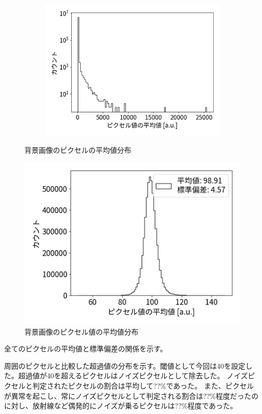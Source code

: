 \documentclass[a4paper,11pt,uplatex]{jsbook}
\begin{document}
\begin{figure}[b]
\begin{subfigure}[b]{0.3\linewidth}
    \includegraphics[width=\linewidth]{image/4-BGmeanall.png}
  \end{subfigure}
  \caption[背景画像の光量分布]{背景画像のピクセルの平均値分布}
\end{figure}



\begin{figure}
  \centering
  \includegraphics[width=0.8\linewidth]{image/4-BGmean.png}
  \caption{背景画像のピクセル値の平均値分布}\label{BGmean}
\end{figure}


全てのピクセルの平均値と標準偏差の関係を示す。

周囲のピクセルと比較した超過値の分布を示す。閾値として今回は40を設定した。超過値が40を超えるピクセルはノイズピクセルとして除去した。
ノイズピクセルと判定されたピクセルの割合は平均して??\%であった。
また、ピクセルが異常を起こし、常にノイズピクセルとして判定される割合は??\%程度だったのに対し、放射線など偶発的にノイズが乗るピクセルは??\%程度であった。
\end{document}

